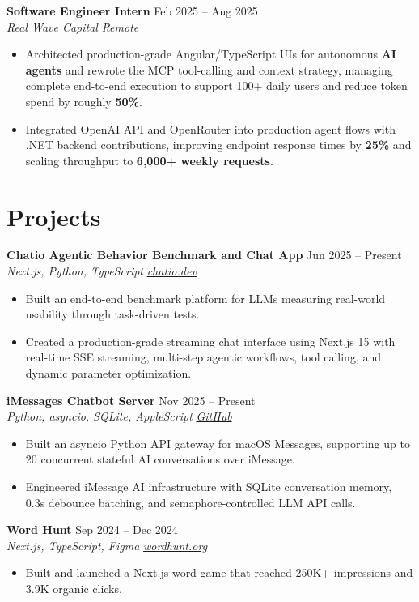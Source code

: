 \documentclass[10pt,letterpaper]{article}
\newif\ifresumeFirstRole
\newcommand{\resumeRole}[4]{%
  \ifresumeFirstRole
    \global\resumeFirstRolefalse
  \else
    \vspace{0pt plus 1fill}%
  \fi
  \textbf{#1} \hfill #2\\
  \textit{#3} \hfill \textit{#4}
}
\begin{document}
\resumeRole{Software Engineer Intern}{Feb 2025 -- Aug 2025}{Real Wave Capital}{Remote}
\begin{itemize}
  \item Architected production-grade Angular/TypeScript UIs for autonomous \textbf{AI agents} and rewrote the MCP tool-calling and context strategy, managing complete end-to-end execution to support 100+ daily users and reduce token spend by roughly \textbf{50\%}.
  \item Integrated OpenAI API and OpenRouter into production agent flows with .NET backend contributions, improving endpoint response times by \textbf{25\%} and scaling throughput to \textbf{6,000+ weekly requests}.
\end{itemize}

\section*{Projects}
\resumeRole{Chatio Agentic Behavior Benchmark and Chat App}{Jun 2025 -- Present}{Next.js, Python, TypeScript}{\href{https://chatio.dev}{chatio.dev}}
\begin{itemize}
  \item Built an end-to-end benchmark platform for LLMs measuring real-world usability through task-driven tests.
  \item Created a production-grade streaming chat interface using Next.js 15 with real-time SSE streaming, multi-step agentic workflows, tool calling, and dynamic parameter optimization.
\end{itemize}

\resumeRole{iMessages Chatbot Server}{Nov 2025 -- Present}{Python, asyncio, SQLite, AppleScript}{\href{https://github.com/alextyhwang/iMessages-Chatbot-Server}{GitHub}}
\begin{itemize}
  \item Built an asyncio Python API gateway for macOS Messages, supporting up to 20 concurrent stateful AI conversations over iMessage.
  \item Engineered iMessage AI infrastructure with SQLite conversation memory, 0.3s debounce batching, and semaphore-controlled LLM API calls.
\end{itemize}

\resumeRole{Word Hunt}{Sep 2024 -- Dec 2024}{Next.js, TypeScript, Figma}{\href{https://wordhunt.org}{wordhunt.org}}
\begin{itemize}
  \item Built and launched a Next.js word game that reached 250K+ impressions and 3.9K organic clicks.
\end{itemize}
\end{document}
